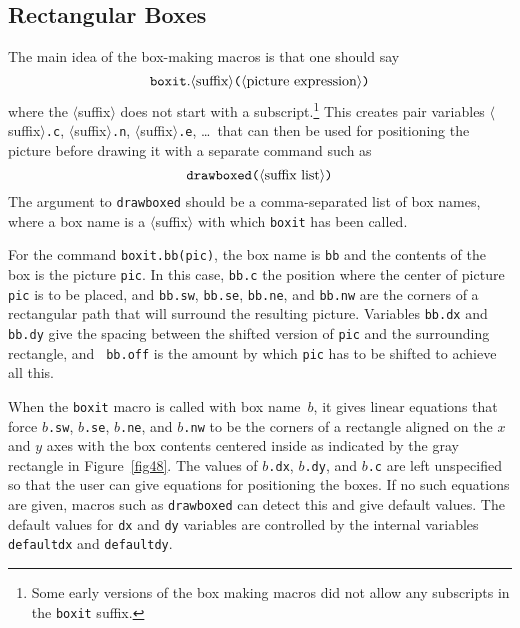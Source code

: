 \documentclass{article} %
\newcommand\descr[1]{{\langle\hbox{#1}\rangle}}
\newcommand\invisgap{\nobreak\hskip0pt\relax}
\newcommand\tdescr[1]{$\langle$\invisgap#1\invisgap$\rangle$}
\begin{document}
\subsection{Rectangular Boxes}

The main idea of the box-making macros is that one should
say\label{Dboxit}
$$ {\tt boxit.} \descr{suffix}
   \hbox{\tt(} \descr{picture expression} \hbox{\tt)}
$$
where the \tdescr{suffix} does not start with a subscript.\footnote{Some early
versions of the box making macros did not allow any subscripts in the
{\tt boxit} suffix.}
This creates pair variables \tdescr{suffix}{\tt.c},
\tdescr{suffix}{\tt.n}, \tdescr{suffix}{\tt.e}, \ldots\ that can then be
used for positioning the picture before drawing it with a separate command such
as\label{Ddrbxed}
$$ \hbox{\tt drawboxed(} \descr{suffix list} \hbox{\tt )} $$
The argument to {\tt drawboxed} should be a comma-separated list of box names,
where a box name is a \tdescr{suffix} with which {\tt boxit}
has been called.

For the command {\tt boxit.bb(pic)}, the box name is {\tt bb} and the
contents of the box is the picture {\tt pic}.  In this case, {\tt bb.c}
the position where the center of picture {\tt pic} is to be placed, and
{\tt bb.sw}, {\tt bb.se}, {\tt bb.ne}, and {\tt bb.nw} are the corners
of a rectangular path that will surround the resulting picture.
Variables {\tt bb.dx} and {\tt bb.dy} give the spacing between the
shifted version of {\tt pic} and the surrounding rectangle, and {\tt
bb.off} is the amount by which {\tt pic} has to be shifted to achieve
all this.

When the {\tt boxit} macro is called with box name~$b$, it gives linear
equations that force $b${\tt.sw}, $b${\tt.se}, $b${\tt.ne}, and
$b${\tt.nw} to be the corners of a rectangle aligned on the $x$ and $y$
axes with the box contents centered inside as indicated by the gray
rectangle in Figure~\ref{fig48}.  The values of $b${\tt.dx},
$b${\tt.dy}, and $b${\tt.c} are left unspecified so that the user can
give equations for positioning the boxes.  If no such equations are
given, macros such as {\tt drawboxed} can detect this and give default
values.  The default values for {\tt dx} and {\tt dy} variables are
controlled by the internal variables {\tt
defaultdx}\label{Ddefaultdx} and
{\tt defaultdy}\label{Ddefaultdy}.
\end{document}
